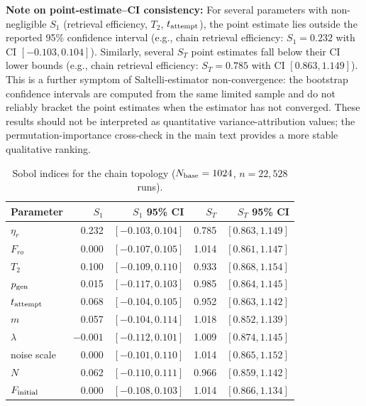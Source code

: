 \documentclass[aps,prapplied,reprint,superscriptaddress]{revtex4-2}
\begin{document}
\textbf{Note on point-estimate--CI consistency:} For several parameters with non-negligible $S_1$ (retrieval efficiency, $T_2$, $t_{\rm attempt}$), the point estimate lies outside the reported 95\% confidence interval (e.g., chain retrieval efficiency: $S_1 = 0.232$ with CI $[-0.103, 0.104]$). Similarly, several $S_T$ point estimates fall below their CI lower bounds (e.g., chain retrieval efficiency: $S_T = 0.785$ with CI $[0.863, 1.149]$). This is a further symptom of Saltelli-estimator non-convergence: the bootstrap confidence intervals are computed from the same limited sample and do not reliably bracket the point estimates when the estimator has not converged. These results should not be interpreted as quantitative variance-attribution values; the permutation-importance cross-check in the main text provides a more stable qualitative ranking.

\begin{table}[htbp]
\centering
\caption{Sobol indices for the chain topology ($N_{\rm base} = 1024$, $n = 22{,}528$ runs).}
\label{tab:sobol_chain}
\begin{tabular}{lrrrr}
\toprule
Parameter & $S_1$ & $S_1$ 95\% CI & $S_T$ & $S_T$ 95\% CI \\
\midrule
$\eta_r$ & 0.232 & $[-0.103, 0.104]$ & 0.785 & $[0.863, 1.149]$ \\
$F_{ro}$ & 0.000 & $[-0.107, 0.105]$ & 1.014 & $[0.861, 1.147]$ \\
$T_2$ & 0.100 & $[-0.109, 0.110]$ & 0.933 & $[0.868, 1.154]$ \\
$p_{\rm gen}$ & 0.015 & $[-0.117, 0.103]$ & 0.985 & $[0.864, 1.145]$ \\
$t_{\rm attempt}$ & 0.068 & $[-0.104, 0.105]$ & 0.952 & $[0.863, 1.142]$ \\
$m$ & 0.057 & $[-0.104, 0.114]$ & 1.018 & $[0.852, 1.139]$ \\
$\lambda$ & $-0.001$ & $[-0.112, 0.101]$ & 1.009 & $[0.874, 1.145]$ \\
noise scale & 0.000 & $[-0.101, 0.110]$ & 1.014 & $[0.865, 1.152]$ \\
$N$ & 0.062 & $[-0.110, 0.111]$ & 0.966 & $[0.859, 1.142]$ \\
$F_{\rm initial}$ & 0.000 & $[-0.108, 0.103]$ & 1.014 & $[0.866, 1.134]$ \\
\bottomrule
\end{tabular}
\end{table}
\end{document}
